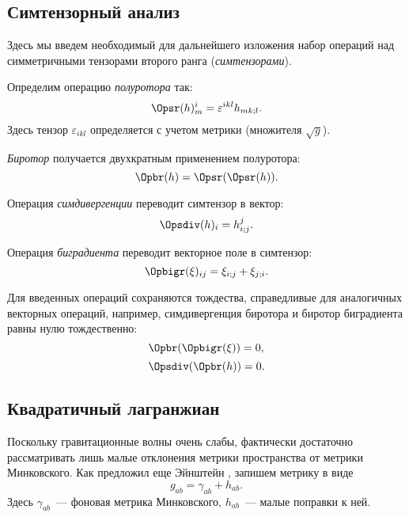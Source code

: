 \documentclass[\docroot/reports/draft/report.tex]{subfiles}
\begin{document}
\onlyinsubfile{\tableofcontents}

\subsection{Симтензорный анализ}

    Здесь мы введем необходимый для дальнейшего изложения набор операций над симметричными тензорами второго ранга (\textit{симтензорами}).

    Определим операцию \textit{полуротора} так:
    \begin{equation}\label{eq:sr}
        \Opsr(h)^i_m = \varepsilon^{ikl} h_{mk;l} .
    \end{equation}
    Здесь тензор $\varepsilon_{ikl}$ определяется с учетом метрики (множителя $\sqrt{g}$).

    \textit{Биротор} получается двухкратным применением полуротора:
    \begin{equation}\label{eq:br}
        \Opbr(h) = \Opsr(\Opsr(h)) .
    \end{equation}

    Операция \textit{симдивергенции} переводит симтензор в вектор:
    \begin{equation}\label{eq:sdiv}
        \Opsdiv(h)_i = h^j_{i;j} .
    \end{equation}

    Операция \textit{биградиента} переводит векторное поле в симтензор:
    \begin{equation}\label{eq:bigr}
        \Opbigr(\xi)_{ij} = \xi_{i;j} + \xi_{j;i}.
    \end{equation}

    Для введенных операций сохраняются тождества, справедливые для аналогичных векторных операций, например, симдивергенция биротора и биротор биградиента равны нулю тождественно:
    \begin{equation}\label{eq:br-of-bigr}
        \Opbr(\Opbigr(\xi)) = 0,
    \end{equation}
    \begin{equation}\label{eq:sdiv-of-br}
        \Opsdiv(\Opbr(h)) = 0.
    \end{equation}

\subsection{Квадратичный лагранжиан}

    Поскольку гравитационные волны очень слабы, фактически достаточно рассматривать лишь малые отклонения метрики пространства от метрики Минковского. Как предложил еще Эйнштейн \cite{einstein_grav_waves}, запишем метрику в виде
    \begin{equation}\label{eq:gab}
        g_{ab} = \gamma_{ab} + h_{ab} .
    \end{equation}
    Здесь $\gamma_{ab}$~--- фоновая метрика Минковского, $h_{ab}$~--- малые поправки к ней.
\end{document}
